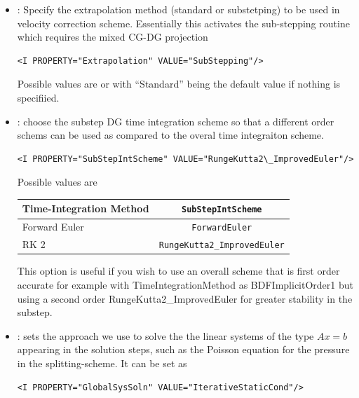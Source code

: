 \begin{itemize}
\item {}: Specify the extrapolation method
  (standard or substetping) to be used in velocity correction
  scheme. Essentially this activates the sub-stepping routine which
  requires the mixed CG-DG projection
  
\begin{lstlisting}[style=XMLStyle]
<I PROPERTY="Extrapolation" VALUE="SubStepping"/>
\end{lstlisting}

Possible values are  or  with ``Standard'' being the default value if nothing is specifiied. 

\item {}: choose the substep DG time integration
  scheme so that a different order schems can be used as compared to
  the overal time integraiton scheme.
\begin{lstlisting}[style=XMLStyle]
<I PROPERTY="SubStepIntScheme" VALUE="RungeKutta2\_ImprovedEuler"/>
\end{lstlisting}

Possible values are
\begin{center}
\footnotesize
\begin{tabular}{lc}
\toprule
{Time-Integration Method} & \texttt{SubStepIntScheme} \\
\midrule
Forward Euler & \texttt{ForwardEuler}  \\
RK 2          & \texttt{RungeKutta2\_ImprovedEuler}  \\
\bottomrule
\end{tabular}
\end{center}

This option is useful if you wish to use an overall scheme that is
first order accurate for example with
TimeIntegrationMethod as BDFImplicitOrder1 but using a second order
RungeKutta2\_ImprovedEuler for greater stability in the substep.

\item {}: sets the approach we use to solve the the linear
systems of the type $Ax=b$ appearing in the solution steps, such as the Poisson
equation for the pressure in the splitting-scheme. It can be set as

\begin{lstlisting}[style=XMLStyle]
<I PROPERTY="GlobalSysSoln" VALUE="IterativeStaticCond"/>
\end{lstlisting}


\end{itemize}
